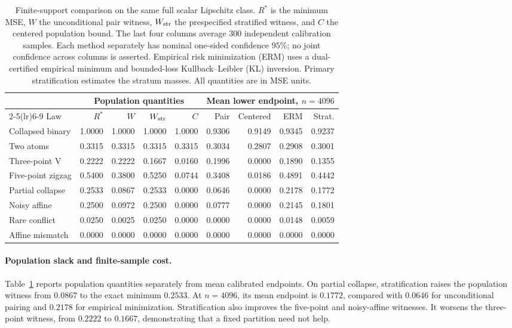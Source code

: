 \begin{table}[t]
\centering\small
\setlength{\tabcolsep}{3pt}
\begin{tabular}{lrrrrrrrr}
\toprule
& \multicolumn{4}{c}{Population quantities} & \multicolumn{4}{c}{Mean lower endpoint, $n=4096$} \\
\cmidrule(lr){2-5}\cmidrule(lr){6-9}
Law & $R^*$ & $W$ & $W_{\rm str}$ & $C$ & Pair & Centered & ERM & Strat. \\
\midrule
Collapsed binary & 1.0000 & 1.0000 & 1.0000 & 1.0000 & 0.9306 & 0.9149 & 0.9345 & 0.9237 \\
Two atoms & 0.3315 & 0.3315 & 0.3315 & 0.3315 & 0.3034 & 0.2807 & 0.2908 & 0.3001 \\
Three-point V & 0.2222 & 0.2222 & 0.1667 & 0.0160 & 0.1996 & 0.0000 & 0.1890 & 0.1355 \\
Five-point zigzag & 0.5400 & 0.3800 & 0.5250 & 0.0744 & 0.3408 & 0.0186 & 0.4891 & 0.4442 \\
Partial collapse & 0.2533 & 0.0867 & 0.2533 & 0.0000 & 0.0646 & 0.0000 & 0.2178 & 0.1772 \\
Noisy affine & 0.2500 & 0.0972 & 0.2500 & 0.0000 & 0.0777 & 0.0000 & 0.2145 & 0.1801 \\
Rare conflict & 0.0250 & 0.0025 & 0.0250 & 0.0000 & 0.0000 & 0.0000 & 0.0148 & 0.0059 \\
Affine mismatch & 0.0000 & 0.0000 & 0.0000 & 0.0000 & 0.0000 & 0.0000 & 0.0000 & 0.0000 \\
\bottomrule
\end{tabular}
\caption{Finite-support comparison on the same full scalar Lipschitz class. $R^*$ is the minimum MSE, $W$ the unconditional pair witness, $W_{\rm str}$ the prespecified stratified witness, and $C$ the centered population bound. The last four columns average 300 independent calibration samples. Each method separately has nominal one-sided confidence $95\%$; no joint confidence across columns is asserted. Empirical risk minimization (ERM) uses a dual-certified empirical minimum and bounded-loss Kullback--Leibler (KL) inversion. Primary stratification estimates the stratum masses. All quantities are in MSE units.}
\label{tab:witness-comparison}
\end{table}


\paragraph{Population slack and finite-sample cost.}
Table~\ref{tab:witness-comparison} reports population quantities separately
from mean calibrated endpoints. On partial collapse, stratification raises
the population witness from $0.0867$ to the exact minimum $0.2533$.
At $n=4096$, its mean endpoint is $0.1772$, compared with $0.0646$ for
unconditional pairing and $0.2178$ for empirical minimization. Stratification
also improves the five-point and noisy-affine witnesses. It worsens the
three-point witness, from $0.2222$ to $0.1667$, demonstrating that a fixed
partition need not help.

